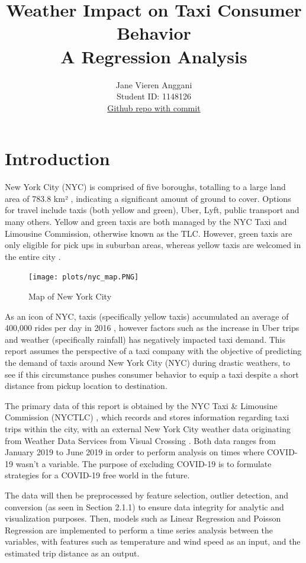 \documentclass[11pt]{article}
\title{\textbf{Weather Impact on Taxi Consumer Behavior} \\ A Regression Analysis}
\author{
Jane Vieren Anggani \\
Student ID: 1148126 \\
\href{https://github.com/MAST30034-Applied-Data-Science/mast30034-project-1-janggani.git}{Github repo with commit}
}
\begin{document}
\maketitle
\section{Introduction}

New York City (NYC) is comprised of five boroughs, totalling to a large land area of 783.8 km² \cite{nycinfo}, indicating a significant amount of ground to cover. Options for travel include taxis (both yellow and green), Uber, Lyft, public transport and many others. Yellow and green taxis are both managed by the NYC Taxi and Limousine Commission, otherwise known as the TLC. However, green taxis are only eligible for pick ups in suburban areas, whereas yellow taxis are welcomed in the entire city \cite{difftaxi}.

\begin{figure}[h]
    \texttt{[image: plots/nyc\_map.PNG]}
    \centering
    \caption{Map of New York City}
\end{figure}

As an icon of NYC, taxis (specifically yellow taxis) accumulated an average of 400,000 rides per day in 2016 \cite{nyctlc2019}, however factors such as the increase in Uber trips \cite{uberincrease} and weather (specifically rainfall) \cite{weathereffect} has negatively impacted taxi demand. This report assumes the perspective of a taxi company with the objective of predicting the demand of taxis around New York City (NYC) during drastic weathers, to see if this circumstance pushes consumer behavior to equip a taxi despite a short distance from pickup location to destination. 

The primary data of this report is obtained by the NYC Taxi \& Limousine Commission (NYCTLC) \cite{nyctlc2019}, which records and stores information regarding taxi trips within the city, with an external New York City weather data originating from Weather Data Services from Visual Crossing \cite{nycweather2019}. Both data ranges from January 2019 to June 2019 in order to perform analysis on times where COVID-19 wasn't a variable. The purpose of excluding COVID-19 is to formulate strategies for a COVID-19 free world in the future.

The data will then be preprocessed by feature selection, outlier detection, and conversion (as seen in Section 2.1.1) to ensure data integrity for analytic and visualization purposes. Then, models such as Linear Regression \cite{linearregression} and Poisson Regression \cite{poissonregression} are implemented to perform a time series analysis between the variables, with features such as temperature and wind speed as an input, and the estimated trip distance as an output.
\end{document}
